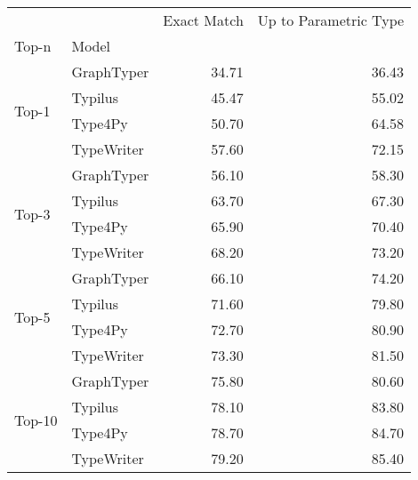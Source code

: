 \begin{tabular}{llrr}
\toprule
 &  & Exact Match & Up to Parametric Type \\
Top-n & Model &  &  \\
\midrule
\multirow[t]{4}{*}{Top-1} & GraphTyper & 34.71 & 36.43 \\
 & Typilus & 45.47 & 55.02 \\
 & Type4Py & 50.70 & 64.58 \\
 & TypeWriter & 57.60 & 72.15 \\
\cline{1-4}
\multirow[t]{4}{*}{Top-3} & GraphTyper & 56.10 & 58.30 \\
 & Typilus & 63.70 & 67.30 \\
 & Type4Py & 65.90 & 70.40 \\
 & TypeWriter & 68.20 & 73.20 \\
\cline{1-4}
\multirow[t]{4}{*}{Top-5} & GraphTyper & 66.10 & 74.20 \\
 & Typilus & 71.60 & 79.80 \\
 & Type4Py & 72.70 & 80.90 \\
 & TypeWriter & 73.30 & 81.50 \\
\cline{1-4}
\multirow[t]{4}{*}{Top-10} & GraphTyper & 75.80 & 80.60 \\
 & Typilus & 78.10 & 83.80 \\
 & Type4Py & 78.70 & 84.70 \\
 & TypeWriter & 79.20 & 85.40 \\
\cline{1-4}
\bottomrule
\end{tabular}

